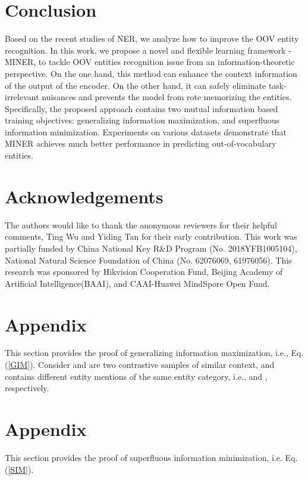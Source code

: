 \documentclass[11pt]{article}
\begin{document}
\section{Conclusion}
Based on the recent studies of NER, we analyze how to improve the OOV entity recognition. In this work, we propose a novel and flexible learning framework - MINER, to tackle OOV entities recognition issue from an information-theoretic perspective. On the one hand, this method can enhance the context information of the output of the encoder. On the other hand, it can safely eliminate task-irrelevant nuisances and prevents the model from rote memorizing the entities. Specifically, the proposed approach contains two mutual information based training objectives: generalizing information maximization, and superfluous information minimization. Experiments on various datasets demonstrate that MINER achieves much better performance in predicting out-of-vocabulary entities.


\section*{Acknowledgements}
The authors would like to thank the anonymous reviewers for their helpful comments, Ting Wu and Yiding Tan for their early contribution. This work was partially funded by China National Key R\&D Program (No. 2018YFB1005104), National Natural Science Foundation of China (No. 62076069, 61976056). This research was sponsored by Hikvision Cooperation Fund, Beijing Academy of Artificial Intelligence(BAAI), and CAAI-Huawei MindSpore Open Fund.




\appendix
\label{appendix}

\section{Appendix}
\label{sec:appendix}
This section provides the proof of generalizing information maximization, i.e., Eq. (\ref{GIM}). Consider  and  are two contrastive samples of similar context, and contains different entity mentions of the same entity category, i.e.,  and , respectively. 





\section{Appendix}
\label{sec:appendix}
This section provides the proof of superfluous information minimization, i.e. Eq. (\ref{SIM}). 
\end{document}
